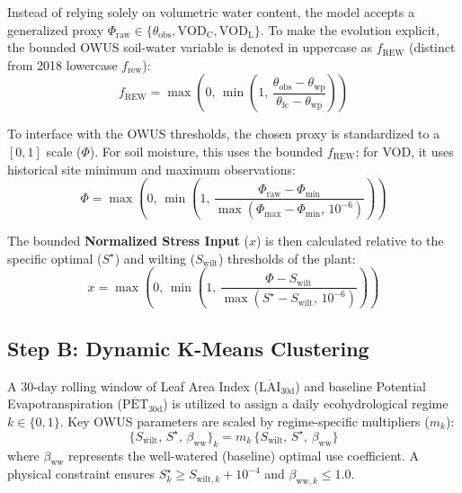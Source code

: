 \documentclass[11pt]{article}
\begin{document}
Instead of relying solely on volumetric water content, the model accepts a generalized proxy $\Phi_{\mathrm{raw}} \in \{\theta_{\mathrm{obs}}, \mathrm{VOD}_{\mathrm{C}}, \mathrm{VOD}_{\mathrm{L}}\}$. To make the evolution explicit, the bounded OWUS soil-water variable is denoted in uppercase as $f_{\mathrm{REW}}$ (distinct from 2018 lowercase $f_{\mathrm{rew}}$):
\begin{equation}
  f_{\mathrm{REW}} = \max\left(0,\, \min\left(1,\, \frac{\theta_{\mathrm{obs}} - \theta_{\mathrm{wp}}}{\theta_{\mathrm{fc}} - \theta_{\mathrm{wp}}}\right)\right)
\end{equation}

To interface with the OWUS thresholds, the chosen proxy is standardized to a $[0,1]$ scale ($\Phi$). For soil moisture, this uses the bounded $f_{\mathrm{REW}}$; for VOD, it uses historical site minimum and maximum observations:
\begin{equation}
  \Phi = \max\left(0,\, \min\left(1,\, \frac{\Phi_{\mathrm{raw}} - \Phi_{\mathrm{min}}}{\max(\Phi_{\mathrm{max}} - \Phi_{\mathrm{min}},\, 10^{-6})}\right)\right)
\end{equation}

The bounded \textbf{Normalized Stress Input} ($x$) is then calculated relative to the specific optimal ($S^\star$) and wilting ($S_{\mathrm{wilt}}$) thresholds of the plant:
\begin{equation}
  x = \max\left(0,\, \min\left(1,\, \frac{\Phi - S_{\mathrm{wilt}}}{\max(S^\star - S_{\mathrm{wilt}},\, 10^{-6})}\right)\right)
\end{equation}

\subsection*{Step B: Dynamic K-Means Clustering}

A 30-day rolling window of Leaf Area Index ($\overline{\mathrm{LAI}}_{30\mathrm{d}}$) and baseline Potential Evapotranspiration ($\overline{\mathrm{PET}}_{30\mathrm{d}}$) is utilized to assign a daily ecohydrological regime $k \in \{0, 1\}$. Key OWUS parameters are scaled by regime-specific multipliers ($m_{k}$):
\begin{equation}
  \{S_{\mathrm{wilt}},\,S^\star,\,\beta_{\mathrm{ww}}\}_{k} = m_{k}\,\{S_{\mathrm{wilt}},\,S^\star,\,\beta_{\mathrm{ww}}\}
\end{equation}
where $\beta_{\mathrm{ww}}$ represents the well-watered (baseline) optimal use coefficient. A physical constraint ensures $S^\star_{k} \ge S_{\mathrm{wilt},k} + 10^{-4}$ and $\beta_{\mathrm{ww},k} \le 1.0$.
\end{document}
